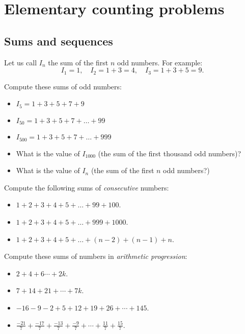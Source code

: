 \chapter{Elementary counting problems}

\section{Sums and sequences}

Let us call $I_n$ the sum of the first $n$ odd numbers. For example:
$$I_1=1, \quad I_2=1+3=4, \quad I_3=1+3+5=9.$$%
\begin{exercise}\label{Prob:SumImp}
Compute these sums of odd numbers:
  \begin{itemize}  
  \item $I_5=1+3+5+7+9$
  \item $I_{50}=1+3+5+7+\dots+99$
  \item $I_{500}=1+3+5+7+\dots+999$
  \item What is the value of $I_{1000}$ (the sum of the first thousand odd numbers)?
  \item What is the value of $I_n$ (the sum of the first $n$ odd numbers?)
\end{itemize}
\end{exercise}
\tutpagebreak

\begin{exercise}\label{Prob:SumGau}
Compute the following sums of \emph{consecutive} numbers:
\begin{itemize} 
    \item $1+2+3+4+5+\dots+99+100$.
    \item $1+2+3+4+5+\dots+999+1000$.
    \item $1+2+3+4+5+\dots+(n-2)+(n-1)+n$.    
\end{itemize}
\end{exercise}



\begin{exercise}
Compute these sums of numbers in \emph{arithmetic progression}:
\begin{itemize} 
    \item $2+4+6\cdots +2k$.
    \item $7+14+21+\cdots +7k$.
    \item $-16-9-2+5+12+19+26+\cdots +145$.
    \item $\frac{-21}{7} + \frac{-17}{7} + \frac{-13}{7}+ \frac{-9}{7} + \cdots + \frac{11}{7} + \frac{15}{7}$.  
\end{itemize}
\end{exercise}
\tutpagebreak

